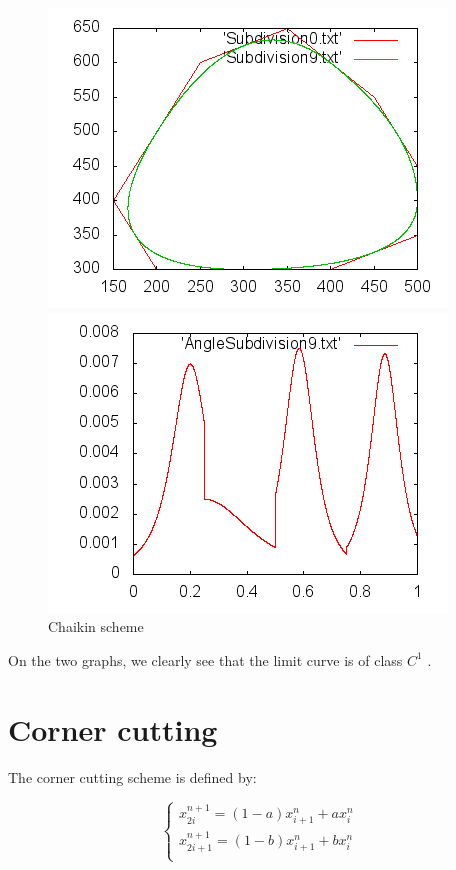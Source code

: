 \documentclass[a4paper,11pt]{article}
\begin{document}
\begin{figure}[H]
\centering
\begin{minipage}{0.35\paperwidth}
\includegraphics[scale=0.75]{pic/poly0.png}
\end{minipage}
\begin{minipage}{0.35\paperwidth}
\includegraphics[scale=0.75]{pic/angle0.png}
\end{minipage}
\caption{Chaikin scheme}
\end{figure}

On the two graphs, we clearly see that the limit curve is of class $ C^1 $ .

\section{Corner cutting}

The corner cutting scheme is defined by:

$$
    \begin{cases}
        x_{2i}^{n+1} = (1 - a) x_{i+1}^n + a x_{i}^n \\
        x_{2i + 1}^{n+1} = (1 - b) x_{i+1}^n + b x_{i}^n \\
    \end{cases}
$$
\end{document}
